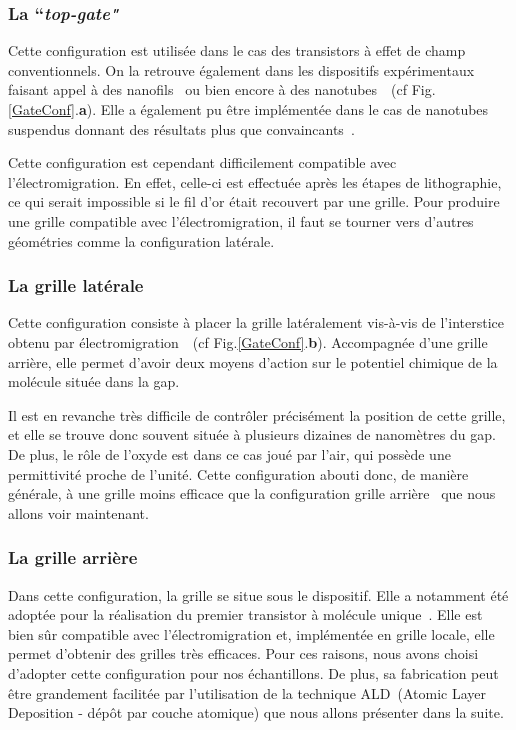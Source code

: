 \subsubsection{La ``\textit{top-gate"}}
Cette configuration est utilisée dans le cas des transistors à effet de champ conventionnels. On la retrouve également dans les dispositifs expérimentaux faisant appel à des nanofils~\cite{Fasth2005} ou bien encore à des nanotubes~\cite{Javey2002}~(cf Fig.\ref{GateConf}.\textbf{a}). Elle a également pu être implémentée dans le cas de nanotubes suspendus donnant des résultats plus que convaincants~\cite{Leturcq2009}.

Cette configuration est cependant difficilement compatible avec l'électromigration. En effet, celle-ci est effectuée après les étapes de lithographie, ce qui serait impossible si le fil d'or était recouvert par une grille. Pour produire une grille compatible avec l'électromigration, il faut se tourner vers d'autres géométries comme la configuration latérale.

\subsubsection{La grille latérale}
Cette configuration consiste à placer la grille latéralement vis-à-vis de l'interstice obtenu par électromigration~\cite{Mangin2009}~(cf Fig.\ref{GateConf}.\textbf{b}). Accompagnée d'une grille arrière, elle permet d'avoir deux moyens d'action sur le potentiel chimique de la molécule située dans la gap. 

Il est en revanche très difficile de contr\^oler précisément la position de cette grille, et elle se trouve donc souvent située à plusieurs dizaines de nanomètres du gap. De plus, le r\^ole de l'oxyde est dans ce cas joué par l'air, qui possède une permittivité proche de l'unité. Cette configuration abouti donc, de manière générale, à une grille moins efficace que la configuration grille arrière~\cite{Aurore2009} que nous allons voir maintenant.


\subsubsection{La grille arrière}
Dans cette configuration, la grille se situe sous le dispositif. Elle a notamment été adoptée pour la réalisation du premier transistor à molécule unique~\cite{Park2000}. Elle est bien s\^ur compatible avec l'électromigration et, implémentée en grille locale, elle permet d'obtenir des grilles très efficaces. Pour ces raisons, nous avons choisi d’adopter cette configuration pour nos échantillons. De plus, sa fabrication peut \^etre grandement facilitée par l'utilisation de la technique ALD~(Atomic Layer Deposition - dép\^ot par couche atomique) que nous allons présenter dans la suite.


